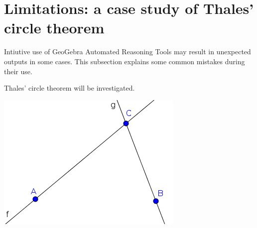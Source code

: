 \documentclass{article}
\begin{document}
\section{Limitations: a case study of Thales' circle theorem}

Intiutive use of GeoGebra Automated Reasoning Tools may result in unexpected outputs in some cases. This subsection explains some common mistakes during their use.

Thales' circle theorem will be investigated.

\begin{center}
\includegraphics[scale=0.5]{limitations-Thales1-1}
\end{center}
\end{document}
